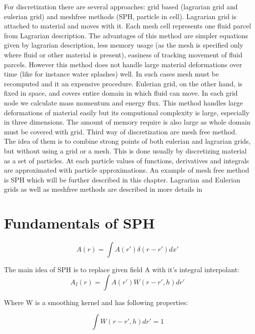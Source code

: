 For discretization there are several approaches: grid based (lagrarian grid and eulerian grid) and meshfree methods (SPH, particle in cell).
Lagrarian grid is attached to material and moves with it. Each mesh cell represents one fluid parcel from Lagrarian description. The advantages of this method are simpler equations given by lagrarian description, less memory usage (as the mesh is specified only where fluid or other material is present), easiness of tracking movement of fluid parcels. However this method does not handle large material deformations over time (like for instance water splashes) well. In such cases mesh must be recomputed and it an expensive procedure.
Eulerian grid, on the other hand, is fixed in space, and covers entire domain in which fluid can move. In each grid node we calculate mass momentum and energy flux. This method handles large deformations of material easily but its computional complexity is large, especially in three dimensions. The amount of memory require is also large as whole domain must be covered with grid. 
Third way of discretization are mesh free method. The idea of them is to combine strong points of both eulerian and lagrarian grids, but without using a grid or a mesh. This is done usually by discretizing material as a set of particles. At each particle values of functions, derivatives and integrals are approximated with particle approximations. An example of mesh free method is SPH which will be further described in this chapter. 
Lagrarian and Eulerian grids as well as meshfree methods are described in more details in \cite[chapter 1]{Liu}

\section{Fundamentals of SPH}

\begin{equation}
\label{eq:integral_identity}
A(r) = \int A(r')\delta(r - r')dx'
\end{equation}

The main idea of SPH is to replace given field A with it's integral interpolant:
\begin{equation}
\label{eq:sph_kernel_interpolant}
A_I(r) = \int A(r')W(r - r', h)dr'
\end{equation}

Where W is a smoothing kernel and has following properties:

\begin{equation}
\label{eq:sph_kernel_property_1}
\int W(r - r', h)dr' = 1
\end{equation}

